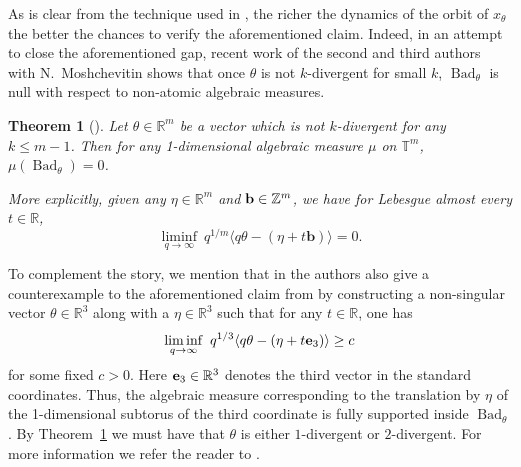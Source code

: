 \documentclass[reqno,11pt]{amsart}
\theoremstyle{plain}
\newtheorem{thm}{Theorem}[section]
\theoremstyle{definition}
\theoremstyle{remark}
\numberwithin{equation}{section}
\newcommand{\R}{{\mathbb{R}}}
\newcommand{\Z}{{\mathbb{Z}}}
\newcommand{\vb}{{\bf b}}
\newcommand{\ve}{{\bf e}}
\newcommand{\bR}{\mathbb{R}}
\newcommand{\bT}{\mathbb{T}}
\newcommand\idist[1]{\langle#1\rangle}
\newcommand\on[1]{\operatorname{#1}}
\newcommand\tb[1]{\textbf{#1}}
\begin{document}
As is clear from the technique 
used in \cite{Sh1}, the richer the dynamics of the orbit of $x_\theta$ the better the chances to verify the aforementioned claim. Indeed, in an attempt to close the aforementioned gap, recent work of the second and third authors with N.\ Moshchevitin shows that once $\theta$ is not $k$-divergent for small $k$, $\on{Bad}_\theta$ is null with respect to non-atomic algebraic measures.

\begin{thm}[\cite{MRS}]\label{thm:MRS}
Let $\theta\in\bR^m$ be a vector which is not $k$-divergent for any {$k\le m-1$}. 
Then for any 1-dimensional algebraic measure $\mu$ on $\bT^m$,  $\mu(\on{Bad}_\theta) = 0$. 

More explicitly, given any $\eta \in \R^m$ and $\vb \in \Z^m$, we have for Lebesgue almost every $t \in \R$,
\begin{equation*} 
\liminf_{q\to\infty} \ q^{1/m} \idist{q\theta  - (\eta + t\tb{b})} = 0.
\end{equation*}
\end{thm}
To complement the story, we mention that in \cite{MRS} the authors also give a counterexample to the aforementioned claim from
\cite{Sh1} by constructing a non-singular vector $\theta \in \bR^3$ along with a $\eta\in \bR^3$ such that for {any} $t\in \bR$,
one has
$$ \liminf_{q\to\infty} \ q^{1/3} \idist{q\theta  -( \eta + t\ve_3)} \ge c$$
for some fixed $c>0$. Here $\ve_3 \in \R^3$ denotes the third vector in the standard coordinates. Thus, the algebraic measure corresponding to the translation by $\eta$ of the 1-dimensional subtorus of the third coordinate is {fully} supported inside $\on{Bad}_\theta$. By Theorem~\ref{thm:MRS} we must have that $\theta$ is either
$1$-divergent or $2$-divergent. For more information we refer the reader to \cite{MRS}.
\end{document}
